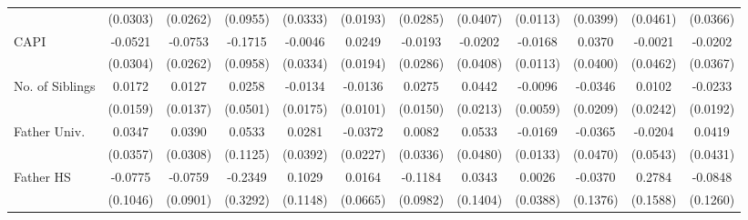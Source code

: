 \begin{table}[htbp]
\begin{tabular}{l*{11}{c}}
            &    (0.0303)         &    (0.0262)         &    (0.0955)         &    (0.0333)         &    (0.0193)         &    (0.0285)         &    (0.0407)         &    (0.0113)         &    (0.0399)         &    (0.0461)         &    (0.0366)         \\
\addlinespace
CAPI        &     -0.0521         &     -0.0753\sym{**} &     -0.1715         &     -0.0046         &      0.0249         &     -0.0193         &     -0.0202         &     -0.0168         &      0.0370         &     -0.0021         &     -0.0202         \\
            &    (0.0304)         &    (0.0262)         &    (0.0958)         &    (0.0334)         &    (0.0194)         &    (0.0286)         &    (0.0408)         &    (0.0113)         &    (0.0400)         &    (0.0462)         &    (0.0367)         \\
\addlinespace
No. of Siblings&      0.0172         &      0.0127         &      0.0258         &     -0.0134         &     -0.0136         &      0.0275         &      0.0442\sym{*}  &     -0.0096         &     -0.0346         &      0.0102         &     -0.0233         \\
            &    (0.0159)         &    (0.0137)         &    (0.0501)         &    (0.0175)         &    (0.0101)         &    (0.0150)         &    (0.0213)         &    (0.0059)         &    (0.0209)         &    (0.0242)         &    (0.0192)         \\
\addlinespace
Father Univ.&      0.0347         &      0.0390         &      0.0533         &      0.0281         &     -0.0372         &      0.0082         &      0.0533         &     -0.0169         &     -0.0365         &     -0.0204         &      0.0419         \\
            &    (0.0357)         &    (0.0308)         &    (0.1125)         &    (0.0392)         &    (0.0227)         &    (0.0336)         &    (0.0480)         &    (0.0133)         &    (0.0470)         &    (0.0543)         &    (0.0431)         \\
\addlinespace
Father HS   &     -0.0775         &     -0.0759         &     -0.2349         &      0.1029         &      0.0164         &     -0.1184         &      0.0343         &      0.0026         &     -0.0370         &      0.2784         &     -0.0848         \\
            &    (0.1046)         &    (0.0901)         &    (0.3292)         &    (0.1148)         &    (0.0665)         &    (0.0982)         &    (0.1404)         &    (0.0388)         &    (0.1376)         &    (0.1588)         &    (0.1260)         \\

\end{tabular}
\end{table}
